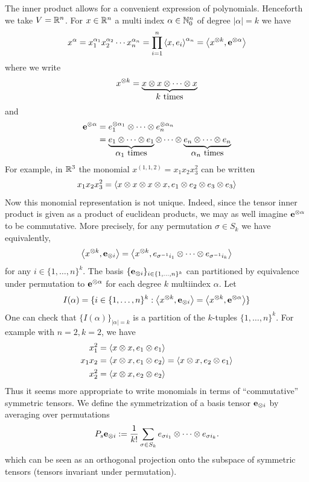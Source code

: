 The inner product allows for a convenient expression of polynomials. Henceforth we take $V = \RR^{n}$. For $x \in \RR^{n}$ a multi index $\alpha \in \NN_0^n$ of degree $|\alpha| = k$ we have
\[
  x^\alpha 
  = x_1^{\alpha_1} x_2^{\alpha_2} \cdots x_n^{\alpha_n}
  = \prod_{i = 1}^{n} \inner{x, e_i}^{\alpha_n}
  = \inner{x^{\otimes k}, \bf{e}^{\otimes \alpha}}
\]
where we write
\[
  x^{\otimes k} = \underbrace{x \otimes x \otimes \cdots \otimes x}_{\hbox{$k$ times}}
\]
and 
\begin{align*}
  {\bf e}^{\otimes \alpha}
  &= e_1^{\otimes \alpha_1} \otimes \cdots \otimes e_n^{\otimes \alpha_n}
  \\
  &= \underbrace{e_1 \otimes \cdots \otimes e_1}_{\hbox{$\alpha_1$ times}} \otimes \cdots \otimes \underbrace{e_n \otimes \cdots \otimes e_n}_{\hbox{$\alpha_n$ times}}
\end{align*}
For example, in $\RR^3$ the monomial $x^{(1, 1, 2)} = x_1x_2x_3^2$ can be written
\[
  x_1x_2x_3^2 = \inner{x \otimes x \otimes x \otimes x, e_1 \otimes e_2 \otimes e_3 \otimes e_3}
\]
Now this monomial representation is not unique. Indeed, since the tensor inner product is given as a product of euclidean products, we may as well imagine $\bf{e}^{\otimes \alpha}$ to be commutative. More precisely, for any permutation $\sigma \in S_k$ we have equivalently,
\[
  \inner{x^{\otimes k}, \bf{e}_{\otimes i}} = \inner{x^{\otimes k}, e_{\sigma^{-1}i_1} \otimes \cdots \otimes e_{\sigma^{-1}i_k}}
\]
for any $i \in \{1, \ldots, n\}^k$. The basis $\{{\bf{e}_{\otimes i}}\}_{i \in \{1, \ldots, n\}^k}$ can partitioned by equivalence under permutation to $\bf{e}^{\otimes \alpha}$ for each degree $k$ multiindex $\alpha$. Let
\[
  I(\alpha) = \{i \in \{1, \ldots, n\}^k : \inner{x^{\otimes k}, \bf{e}_{\otimes i}} = \inner{x^{\otimes k}, \bf{e}^{\otimes \alpha}}\}
\]
One can check that $\{I(\alpha)\}_{|\alpha| = k}$ is a partition of the $k$-tuples $\{1, \ldots, n\}^k$. For example with $n = 2, k = 2$, we have
\begin{align*}
  x_1^2 &= \inner{x \otimes x, e_1 \otimes e_1} \\
  x_1x_2 &= \inner{x \otimes x, e_1 \otimes e_2} = \inner{x \otimes x, e_2 \otimes e_1} \\
  x_2^2 &= \inner{x \otimes x, e_2 \otimes e_2}
\end{align*}
Thus it seems more appropriate to write monomials in terms of ``commutative'' symmetric tensors. We define the symmetrization of a basis tensor $\bf{e}_{\otimes i}$ by averaging over permutations
\[
  P_s \bf{e}_{\otimes i} := \frac1{k!} \sum_{\sigma \in S_k} e_{\sigma i_1} \otimes \cdots \otimes e_{\sigma i_k}.
\]
which can be seen as an orthogonal projection onto the subspace of symmetric tensors (tensors invariant under permutation).

